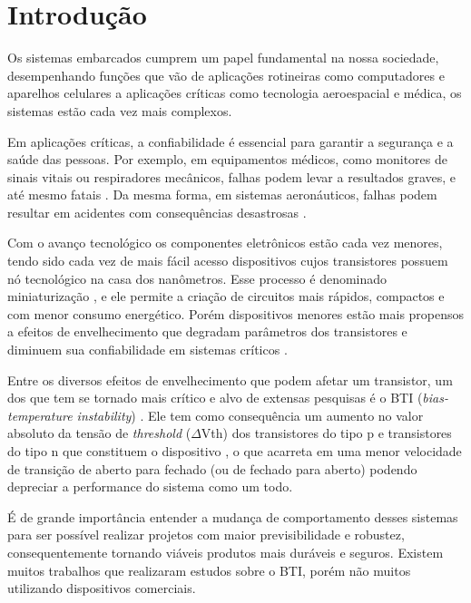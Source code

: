 	\chapter{Introdução}

Os sistemas embarcados cumprem um papel fundamental na nossa sociedade, desempenhando funções que vão de aplicações rotineiras como computadores e aparelhos celulares a aplicações críticas como tecnologia aeroespacial e médica, os sistemas estão cada vez mais complexos.

Em aplicações críticas, a confiabilidade é essencial para garantir a segurança e a saúde das pessoas. Por exemplo, em equipamentos médicos, como monitores de sinais vitais ou respiradores mecânicos, falhas podem levar a resultados graves, e até mesmo fatais \cite{Kocak}. Da mesma forma, em sistemas aeronáuticos, falhas podem resultar em acidentes com consequências desastrosas \cite{Galler}.

Com o avanço tecnológico os componentes eletrônicos estão cada vez menores, tendo sido cada vez de mais fácil acesso dispositivos cujos transistores possuem nó tecnológico na casa dos nanômetros. Esse processo é denominado miniaturização \cite{Radamson}, e ele permite a criação de circuitos mais rápidos, compactos e com menor consumo energético. Porém dispositivos menores estão mais propensos a efeitos de envelhecimento que degradam parâmetros dos transistores e diminuem sua confiabilidade em sistemas críticos \cite{Lorenz}.


Entre os diversos efeitos de envelhecimento que podem afetar um transistor, um dos que tem se tornado mais crítico e alvo de extensas pesquisas é o BTI (\textit{bias-temperature instability}) \cite{Garcia}. Ele tem como consequência um aumento no valor absoluto da tensão de \textit{threshold} ($\Delta$Vth) dos transistores do tipo p e transistores do tipo n que constituem o dispositivo \cite{Paul}, o que acarreta em uma menor velocidade de transição de aberto para fechado (ou de fechado para aberto) podendo depreciar a performance do sistema como um todo.

É de grande importância entender a mudança de comportamento desses sistemas para ser possível realizar projetos com maior previsibilidade e robustez, consequentemente tornando viáveis produtos mais duráveis e seguros. Existem muitos trabalhos que realizaram estudos sobre o BTI, porém não muitos utilizando dispositivos comerciais.

